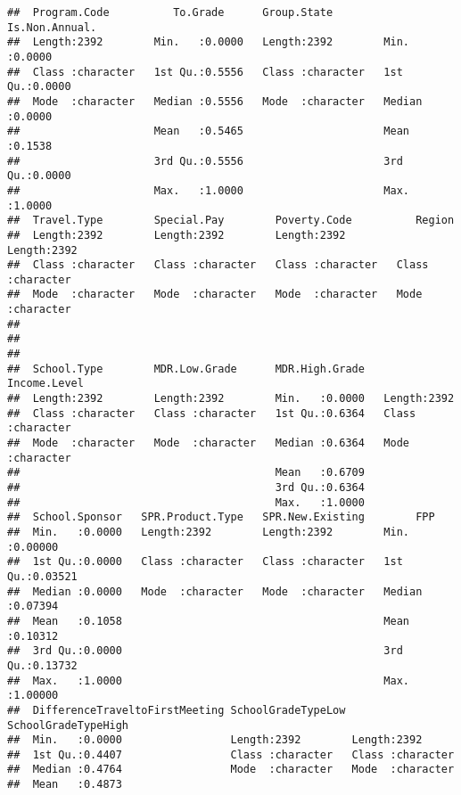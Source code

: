 \documentclass[
]{article}
\begin{document}
\begin{verbatim}
##  Program.Code          To.Grade      Group.State        Is.Non.Annual.  
##  Length:2392        Min.   :0.0000   Length:2392        Min.   :0.0000  
##  Class :character   1st Qu.:0.5556   Class :character   1st Qu.:0.0000  
##  Mode  :character   Median :0.5556   Mode  :character   Median :0.0000  
##                     Mean   :0.5465                      Mean   :0.1538  
##                     3rd Qu.:0.5556                      3rd Qu.:0.0000  
##                     Max.   :1.0000                      Max.   :1.0000  
##  Travel.Type        Special.Pay        Poverty.Code          Region         
##  Length:2392        Length:2392        Length:2392        Length:2392       
##  Class :character   Class :character   Class :character   Class :character  
##  Mode  :character   Mode  :character   Mode  :character   Mode  :character  
##                                                                             
##                                                                             
##                                                                             
##  School.Type        MDR.Low.Grade      MDR.High.Grade   Income.Level      
##  Length:2392        Length:2392        Min.   :0.0000   Length:2392       
##  Class :character   Class :character   1st Qu.:0.6364   Class :character  
##  Mode  :character   Mode  :character   Median :0.6364   Mode  :character  
##                                        Mean   :0.6709                     
##                                        3rd Qu.:0.6364                     
##                                        Max.   :1.0000                     
##  School.Sponsor   SPR.Product.Type   SPR.New.Existing        FPP         
##  Min.   :0.0000   Length:2392        Length:2392        Min.   :0.00000  
##  1st Qu.:0.0000   Class :character   Class :character   1st Qu.:0.03521  
##  Median :0.0000   Mode  :character   Mode  :character   Median :0.07394  
##  Mean   :0.1058                                         Mean   :0.10312  
##  3rd Qu.:0.0000                                         3rd Qu.:0.13732  
##  Max.   :1.0000                                         Max.   :1.00000  
##  DifferenceTraveltoFirstMeeting SchoolGradeTypeLow SchoolGradeTypeHigh
##  Min.   :0.0000                 Length:2392        Length:2392        
##  1st Qu.:0.4407                 Class :character   Class :character   
##  Median :0.4764                 Mode  :character   Mode  :character   
##  Mean   :0.4873                                                       

\end{verbatim}
\end{document}
